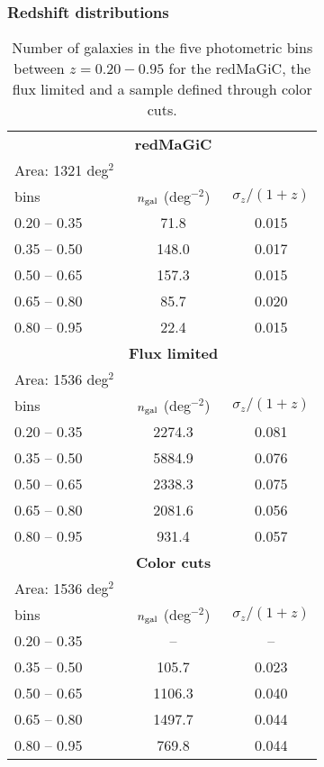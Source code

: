 \documentclass[a4paper,fleqn,usenatbib]{mnras}
\begin{document}
\subsubsection{Redshift distributions}
\label{subsub: distributions}

\begin{table}
\centering
\caption{Number of galaxies in the five photometric bins between $z=0.20-0.95$ for the redMaGiC, the  flux limited and a sample defined through color cuts.}
 \label{tab: bin_n_size}
 \begin{tabular}{lcc}
  \hhline{===}
   &   {\textbf{redMaGiC}}&  \\
  Area: 1321 deg$^2$ & & \\
  \hline
   bins&  $n_{\mbox{\scriptsize{gal}}}$ (deg$^{-2}$)   & ${\sigma}_z/(1+z)$ \\
  \hline
  0.20 -- 0.35 & 71.8  & 0.015 \\
  0.35 -- 0.50 & 148.0 & 0.017 \\
  0.50 -- 0.65 &  157.3 & 0.015 \\
  0.65 -- 0.80 &  85.7 & 0.020 \\
  0.80 -- 0.95 &  22.4 & 0.015 \\
  \hline
  \hhline{===}
   & {\textbf{Flux limited}} &  \\
   Area: 1536 deg$^2$ & & \\
   \hline
   bins&  $n_{\mbox{\scriptsize{gal}}}$ (deg$^{-2}$)   & ${\sigma}_z/(1+z)$  \\
  \hline
  0.20 -- 0.35 & 2274.3 & 0.081  \\
  0.35 -- 0.50 & 5884.9  & 0.076  \\
  0.50 -- 0.65 & 2338.3 & 0.075 \\
  0.65 -- 0.80 & 2081.6 & 0.056 \\
  0.80 -- 0.95 & 931.4 & 0.057 \\
  \hline
  \hhline{===}
  & {\textbf{Color cuts}} &  \\
   Area: 1536 deg$^2$ & & \\
   \hline
   bins&   $n_{\mbox{\scriptsize{gal}}}$ (deg$^{-2}$)    & ${\sigma}_{z}/(1+z)$  \\
  \hline
  0.20 -- 0.35 & -- & -- \\
  0.35 -- 0.50 & 105.7  & 0.023 \\
  0.50 -- 0.65 & 1106.3 & 0.040 \\
  0.65 -- 0.80 & 1497.7 & 0.044 \\
  0.80 -- 0.95 & 769.8 & 0.044 \\
  \hline
 \end{tabular}
\end{table}
\end{document}
